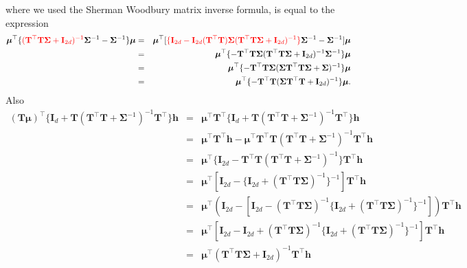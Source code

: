 \documentclass[12pt]{article}
\newcommand{\0}{\mathbf{0}}
\begin{document}
where we used the Sherman Woodbury matrix inverse formula, is equal to the expression
\begin{eqnarray*}
\boldsymbol{\mu}^{\top} \{ \textcolor{red}{(\mathbf{T}^{\top} \mathbf{T} \boldsymbol{\Sigma}  + \mathbf{I}_{2 d} )^{-1}}  \boldsymbol{\Sigma}^{-1} - \boldsymbol{\Sigma}^{-1} \}  \boldsymbol{\mu} & = & \boldsymbol{\mu}^{\top} [ \textcolor{red}{\{  \mathbf{I}_{2 d} -  \mathbf{I}_{2 d} (\mathbf{T}^{\top} \mathbf{T}) \boldsymbol{\Sigma} (\mathbf{T}^{\top} \mathbf{T} \boldsymbol{\Sigma}  + \mathbf{I}_{2 d} )^{-1} \} }  \boldsymbol{\Sigma}^{-1} - \boldsymbol{\Sigma}^{-1} ]  \boldsymbol{\mu} \\
& = & \boldsymbol{\mu}^{\top} \{ - \mathbf{T}^{\top} \mathbf{T} \boldsymbol{\Sigma} (\mathbf{T}^{\top} \mathbf{T} \boldsymbol{\Sigma}  + \mathbf{I}_{2 d} )^{-1}  \boldsymbol{\Sigma}^{-1} \} \boldsymbol{\mu} \\
& = & \boldsymbol{\mu}^{\top} \{ - \mathbf{T}^{\top} \mathbf{T} \boldsymbol{\Sigma} (\boldsymbol{\Sigma} \mathbf{T}^{\top} \mathbf{T} \boldsymbol{\Sigma}  + \boldsymbol{\Sigma} )^{-1} \} \boldsymbol{\mu} \\
& = & \boldsymbol{\mu}^{\top} \{ - \mathbf{T}^{\top} \mathbf{T}  (\boldsymbol{\Sigma} \mathbf{T}^{\top} \mathbf{T} +  \mathbf{I}_{2 d} )^{-1} \} \boldsymbol{\mu}.
\end{eqnarray*}
Also
\begin{eqnarray*}
 (\mathbf{T} \boldsymbol{\mu} )^{\top} \{ \mathbf{I}_d + \mathbf{T} ( \mathbf{T}^{\top} \mathbf{T} + \boldsymbol{\Sigma}^{-1} )^{-1} \mathbf{T}^{\top} \} \mathbf{h} 
& = & \boldsymbol{\mu} ^{\top} \mathbf{T}^{\top} \{\mathbf{I}_d + \mathbf{T} ( \mathbf{T}^{\top} \mathbf{T} + \boldsymbol{\Sigma}^{-1} )^{-1} \mathbf{T}^{\top} \} \mathbf{h} \\
& = & \boldsymbol{\mu} ^{\top} \mathbf{T}^{\top} \mathbf{h}  -  \boldsymbol{\mu} ^{\top} \mathbf{T}^{\top} \mathbf{T} ( \mathbf{T}^{\top} \mathbf{T} + \boldsymbol{\Sigma}^{-1} )^{-1} \mathbf{T}^{\top} \mathbf{h} \\
&=& \boldsymbol{\mu} ^{\top} \{ \mathbf{I}_{2 d} - \mathbf{T}^{\top} \mathbf{T} ( \mathbf{T}^{\top} \mathbf{T} + \boldsymbol{\Sigma}^{-1} )^{-1} \} \mathbf{T}^{\top} \mathbf{h} \\
&=& \boldsymbol{\mu} ^{\top} [ \mathbf{I}_{2 d} - \{ \mathbf{I}_{2 d} + (\mathbf{T}^{\top} \mathbf{T} \boldsymbol{\Sigma})^{-1} \}^{-1} ]  \mathbf{T}^{\top} \mathbf{h}  \\
&=& \boldsymbol{\mu} ^{\top} ( \mathbf{I}_{2 d} - [ \mathbf{I}_{2 d} - (\mathbf{T}^{\top} \mathbf{T} \boldsymbol{\Sigma})^{-1}  \{ \mathbf{I}_{2 d} + (\mathbf{T}^{\top} \mathbf{T} \boldsymbol{\Sigma})^{-1} \}^{-1}] )  \mathbf{T}^{\top} \mathbf{h}  \\
&=& \boldsymbol{\mu} ^{\top} [ \mathbf{I}_{2 d} - \mathbf{I}_{2 d} + (\mathbf{T}^{\top} \mathbf{T} \boldsymbol{\Sigma})^{-1}  \{ \mathbf{I}_{2 d} + (\mathbf{T}^{\top} \mathbf{T} \boldsymbol{\Sigma})^{-1} \}^{-1} ]  \mathbf{T}^{\top} \mathbf{h}  \\
&=& \boldsymbol{\mu} ^{\top} (\mathbf{T}^{\top} \mathbf{T} \boldsymbol{\Sigma} + \mathbf{I}_{2 d} )^{-1}   \mathbf{T}^{\top} \mathbf{h} 
\end{eqnarray*}
\end{document}
